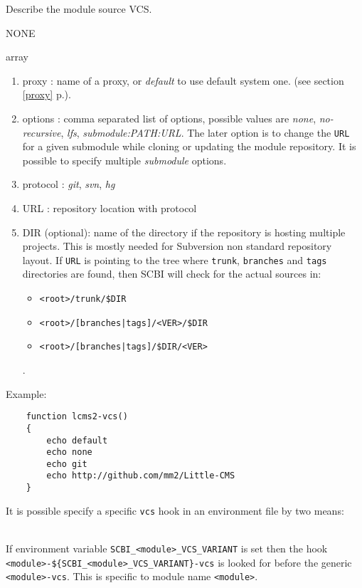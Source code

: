 \documentclass[a4paper,12pt,twoside]{article}
\newcommand{\code}[1]{\texttt{#1}}
\renewcommand{\emph}[1]{\textit{#1}}
\newcommand{\seeref}[1]{see section \ref{#1} p.\pageref{#1}}
\begin{document}
\begin{description}[font=\large\texttt]

	\item[<module>{[}-<variant>{]}-vcs] Describe the module source VCS.
	\begin{description}[font=\textit,style=standard]
		\item[parameter] \tabto{2cm} NONE
		\item[return] \tabto{2cm} array
		\begin{enumerate}
			\item proxy : name of a proxy, or \emph{default} to use default system one. (\seeref{proxy}).
			\item options : comma separated list of options, possible values are \emph{none}, \emph{no-recursive}, \emph{lfs}, \emph{submodule:PATH:URL}. The later option is to change the \code{URL} for a given submodule while cloning or updating the module repository. It is possible to specify multiple \emph{submodule} options.
			\item protocol : \emph{git}, \emph{svn}, \emph{hg}
			\item URL : repository location with protocol
			\item DIR (optional): name of the directory if the repository is hosting multiple projects. This is mostly needed for Subversion non standard repository layout. If \code{URL} is pointing to the tree where \code{trunk}, \code{branches} and \code{tags} directories are found, then SCBI will check for the actual sources in:
			\begin{itemize}
				\item \code{<root>/trunk/\$DIR}
				\item \code{<root>/[branches|tags]/<VER>/\$DIR}
				\item \code{<root>/[branches|tags]/\$DIR/<VER>}
			\end{itemize}.
		\end{enumerate}
	\end{description}

	Example:
	\begin{lstlisting}
	function lcms2-vcs()
	{
		echo default
		echo none
		echo git
		echo http://github.com/mm2/Little-CMS
	}
	\end{lstlisting}

	It is possible specify a specific \code{vcs} hook in an environment file by two means:

	\begin{description}[style=standard]
		\item[\code{SCBI\_<module>\_VCS\_VARIANT}] \hfill \\
		If environment variable \code{SCBI\_<module>\_VCS\_VARIANT} is set then the hook \\ \code{<module>-\$\{SCBI\_<module>\_VCS\_VARIANT\}-vcs} is looked for before the generic \code{<module>-vcs}. This is specific to module name \code{<module>}.


\end{description}
\end{description}
\end{document}
